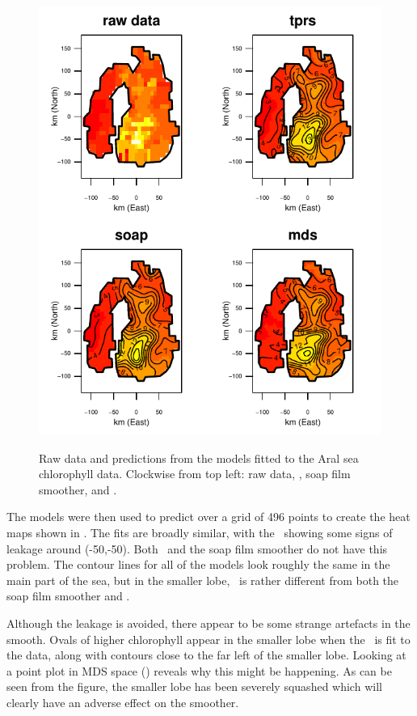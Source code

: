 \begin{figure}
\centering
\includegraphics{mds/figs/aral-fit.pdf} \\
\caption{Raw data and predictions from the models fitted to the Aral sea chlorophyll data. Clockwise from top left: raw data, \tprs, soap film smoother, and \mdsap.}
\label{aral-fit}
\end{figure}

The models were then used to predict over a grid of 496 points to create the heat maps shown in . The fits are broadly similar, with the \tprs\ showing some signs of leakage around (-50,-50). Both \mdsap\ and the soap film smoother do not have this problem. The contour lines for all of the models look roughly the same in the main part of the sea, but in the smaller lobe, \mdsap\ is rather different from both the soap film smoother and \tprs. 

Although the leakage is avoided, there appear to be some strange artefacts in the smooth. Ovals of higher chlorophyll appear in the smaller lobe when the \mdsap\ is fit to the data, along with contours close to the far left of the smaller lobe. Looking at a point plot in MDS space () reveals why this might be happening. As can be seen from the figure, the smaller lobe has been severely squashed which will clearly have an adverse effect on the smoother.

